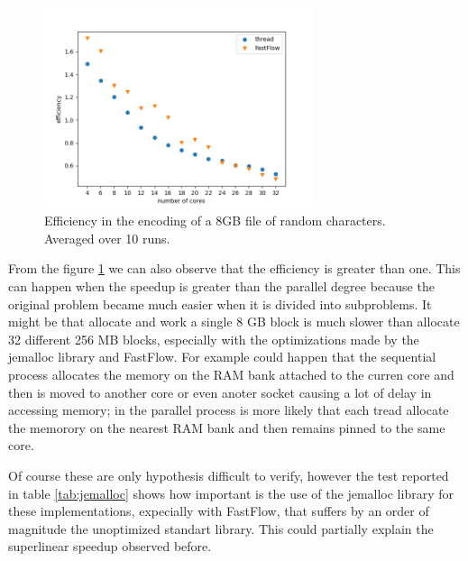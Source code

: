 \documentclass[12pt, letterpaper]{article}
\begin{document}
\begin{figure}
    \centering
    \includegraphics[width=0.7\textwidth]{./images/efficiency.png}
    \caption{Efficiency in the encoding of a 8GB file of random characters. Averaged over 10 runs.}
    \label{fig:efficiency}
\end{figure}

From the figure \ref{fig:efficiency} we can also observe that the efficiency is greater than one. This can happen when the speedup is greater than the parallel degree because the original problem became much easier when it is divided into subproblems. It might be that allocate and work a single 8 GB block is much slower than allocate 32 different 256 MB blocks, especially with the optimizations made by the jemalloc library and FastFlow. For example could happen that the sequential process allocates the memory on the RAM bank attached to the curren core and then is moved to another core or even anoter socket causing a lot of delay in accessing memory; in the parallel process is more likely that each tread allocate the memorory on the nearest RAM bank and then remains pinned to the same core.

Of course these are only hypothesis difficult to verify, however the test reported in table \ref{tab:jemalloc} shows how important is the use of the jemalloc library for these implementations, expecially with FastFlow, that suffers by an order of magnitude the unoptimized standart library. This could partially explain the superlinear speedup observed before.
\end{document}
